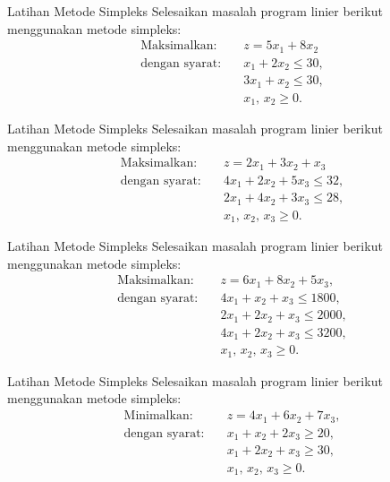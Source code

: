 \begin{ex}{Latihan Metode Simpleks}{}
\label{ex:simplex-practice-5-8}
 Selesaikan masalah program linier berikut menggunakan metode simpleks:
\[
\begin{aligned}
\text{Maksimalkan:}\quad & z = 5x_{1} + 8x_{2}\\
\text{dengan syarat:}\quad & x_{1} + 2x_{2} \le 30,\\
& 3x_{1} + x_{2} \le 30,\\
& x_{1},\, x_{2} \ge 0.
\end{aligned}
\]
\exrefs{\S\ref{sec:pivoting}; \S\ref{sec:simplex-algorithm}}
\end{ex}

\begin{ex}{Latihan Metode Simpleks}{}
\label{ex:simplex-practice-3var-1}
 Selesaikan masalah program linier berikut menggunakan metode simpleks:
\[
\begin{aligned}
\text{Maksimalkan:}\quad & z = 2x_{1} + 3x_{2} + x_{3} \\
\text{dengan syarat:}\quad & 4x_{1} + 2x_{2} + 5x_{3} \le 32,\\
& 2x_{1} + 4x_{2} + 3x_{3} \le 28,\\
& x_{1},\, x_{2},\, x_{3} \ge 0.
\end{aligned}
\]
\exrefs{\S\ref{sec:pivoting}; \S\ref{sec:simplex-algorithm}}
\end{ex}

\begin{ex}{Latihan Metode Simpleks}{}
\label{ex:simplex-practice-3var-2}
 Selesaikan masalah program linier berikut menggunakan metode simpleks:
\[
\begin{aligned}
\text{Maksimalkan:}\quad & z = 6x_{1} + 8x_{2} + 5x_{3},\\
\text{dengan syarat:}\quad & 4x_{1} + x_{2} + x_{3} \le 1800,\\
& 2x_{1} + 2x_{2} + x_{3} \le 2000,\\
& 4x_{1} + 2x_{2} + x_{3} \le 3200,\\
& x_{1},\, x_{2},\, x_{3} \ge 0.
\end{aligned}
\]
\exrefs{\S\ref{sec:pivoting}; \S\ref{sec:simplex-algorithm}}
\end{ex}

\begin{ex}{Latihan Metode Simpleks}{}
\label{ex:simplex-bigm-practice-1}
 Selesaikan masalah program linier berikut menggunakan metode simpleks:
\[
\begin{aligned}
\text{Minimalkan:}\quad & z = 4x_{1} + 6x_{2} + 7x_{3}, \\
\text{dengan syarat:}\quad & x_{1} + x_{2} + 2x_{3} \ge 20,\\
& x_{1} + 2x_{2} + x_{3} \ge 30,\\
& x_{1},\, x_{2},\, x_{3} \ge 0.
\end{aligned}
\]
\exrefs{\S\ref{sec:big-m-dictionary}}
\end{ex}

